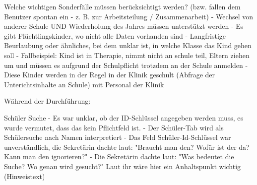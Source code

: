 Welche wichtigen Sonderfälle müssen berücksichtigt werden? (bzw. fallen dem Benutzer spontan ein - z. B. zur Arbeitsteilung / Zusammenarbeit)
- Wechsel von anderer Schule UND Wiederholung des Jahres müssen unterstützt werden
- Es gibt Flüchtlingskinder, wo nicht alle Daten vorhanden sind
- Langfristige Beurlaubung oder ähnliches, bei dem unklar ist, in welche Klasse das Kind gehen soll
    - Fallbeispiel: Kind ist in Therapie, nimmt nicht an schule teil, Eltern ziehen um und müssen es aufgrund der Schulpflicht trotzdem an der Schule anmelden
- Diese Kinder werden in der Regel in der Klinik geschult (Abfrage der Unterichtsinhalte an Schule) mit Personal der Klinik




Während der Durchführung:		

Schüler Suche
- Es war unklar, ob der ID-Schlüssel angegeben werden muss, es wurde vermutet, dass das kein Pflichtfeld ist.
- Der Schüler-Tab wird als Schülersuche nach Namen interpretiert
- Das Feld Schüler-Id-Schlüssel war unverständlich, die Sekretärin dachte laut: "Braucht man den? Wofür ist der da? Kann man den ignorieren?"
- Die Sekretärin dachte laut: "Was bedeutet die Suche? Wo genau wird gesucht?" Laut ihr wäre hier ein Anhaltspunkt wichtig (Hinweistext)










